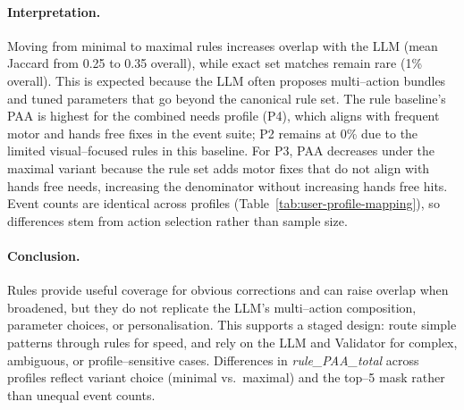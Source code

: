 \begin{table}[H]
\centering
\small %
\setlength{\tabcolsep}{3pt} %
\caption{Rule baseline vs.\ LLM by profile. Jaccard is set overlap of action names.}
\label{tab:rule-vs-llm-compact}
\end{table}

\paragraph{Interpretation.}
Moving from minimal to maximal rules increases overlap with the LLM (mean Jaccard from 0.25 to 0.35 overall), while exact set matches remain rare (1\% overall). This is expected because the LLM often proposes multi–action bundles and tuned parameters that go beyond the canonical rule set. The rule baseline’s PAA is highest for the combined needs profile (P4), which aligns with frequent motor and hands free fixes in the event suite; P2 remains at 0\% due to the limited visual–focused rules in this baseline. For P3, PAA decreases under the maximal variant because the rule set adds motor fixes that do not align with hands free needs, increasing the denominator without increasing hands free hits. Event counts are identical across profiles (Table~\ref{tab:user-profile-mapping}), so differences stem from action selection rather than sample size.

\paragraph{Conclusion.}
Rules provide useful coverage for obvious corrections and can raise overlap when broadened, but they do not replicate the LLM’s multi–action composition, parameter choices, or personalisation. This supports a staged design: route simple patterns through rules for speed, and rely on the LLM and Validator for complex, ambiguous, or profile–sensitive cases. Differences in \emph{rule\_PAA\_total} across profiles reflect variant choice (minimal vs.\ maximal) and the top–5 mask rather than unequal event counts. 


